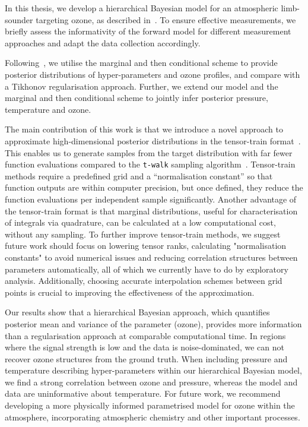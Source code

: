 In this thesis, we develop a hierarchical Bayesian model for an atmospheric limb-sounder targeting ozone, as described in~\cite{mipas2000handbook}.
To ensure effective measurements, we briefly assess the informativity of the forward model for different measurement approaches and adapt the data collection accordingly.

Following~\cite{fox2016fast}, we utilise the marginal and then conditional scheme to provide posterior distributions of hyper-parameters and ozone profiles, and compare with a Tikhonov regularisation approach.
Further, we extend our model and the marginal and then conditional scheme to jointly infer posterior pressure, temperature and ozone.

The main contribution of this work is that we introduce a novel approach to approximate high-dimensional posterior distributions in the tensor-train format~\cite{cui2022deep}.
This enables us to generate samples from the target distribution with far fewer function evaluations compared to the \texttt{t-walk} sampling algorithm~\cite{christen2010general}.
Tensor-train methods require a predefined grid and a ``normalisation constant'' so that function outputs are within computer precision, but once defined, they reduce the function evaluations per independent sample significantly.
Another advantage of the tensor-train format is that marginal distributions, useful for characterisation of integrals via quadrature, can be calculated at a low computational cost, without any sampling.
To further improve tensor-train methods, we suggest future work should focus on lowering tensor ranks, calculating "normalisation constants" to avoid numerical issues and reducing correlation structures between parameters automatically, all of which we currently have to do by exploratory analysis.
Additionally, choosing accurate interpolation schemes between grid points is crucial to improving the effectiveness of the approximation.

Our results show that a hierarchical Bayesian approach, which quantifies posterior mean and variance of the parameter (ozone), provides more information than a regularisation approach at comparable computational time.
In regions where the signal strength is low and the data is noise-dominated, we can not recover ozone structures from the ground truth.
When including pressure and temperature describing hyper-parameters within our hierarchical Bayesian model, we find a strong correlation between ozone and pressure, whereas the model and data are uninformative about temperature.
For future work, we recommend developing a more physically informed parametrised model for ozone within the atmosphere, incorporating atmospheric chemistry and other important processes.